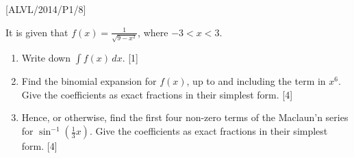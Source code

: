 \item {[}ALVL/2014/P1/8{]}

It is given that $f\left(x\right)=\frac{1}{\sqrt{9-x^{2}}}$, where
$-3<x<3$. 
\begin{enumerate}
\item Write down $\int f\left(x\right)\,dx$.\hfill{} {[}1{]}
\item Find the binomial expansion for $f\left(x\right)$, up to and including
the term in $x^{6}$. Give the coefficients as exact fractions in
their simplest form.\hfill{} {[}4{]}
\item Hence, or otherwise, find the first four non-zero terms of the Maclaun'n
series for $\sin^{-1}\left(\frac{1}{3}x\right)$. Give the coefficients
as exact fractions in their simplest form.\hfill{} {[}4{]}
\end{enumerate}
